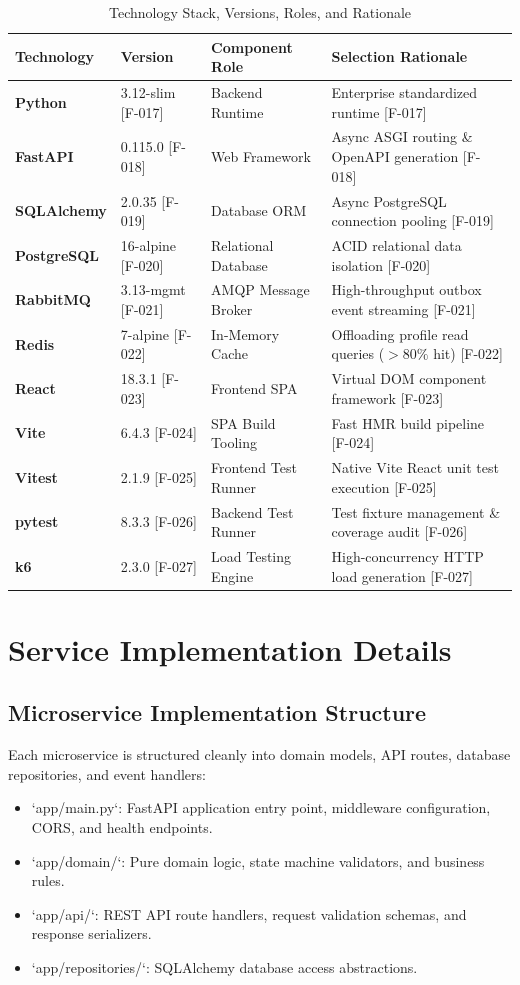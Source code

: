\documentclass[11pt,a4paper]{article}
\begin{document}
\begin{table}[htbp]
\caption{Technology Stack, Versions, Roles, and Rationale}
\centering
\begin{tabularx}{\linewidth}{l l X X}
\toprule
\textbf{Technology} & \textbf{Version} & \textbf{Component Role} & \textbf{Selection Rationale} \\
\midrule
\textbf{Python} & 3.12-slim [F-017] & Backend Runtime & Enterprise standardized runtime [F-017] \\
\textbf{FastAPI} & 0.115.0 [F-018] & Web Framework & Async ASGI routing \& OpenAPI generation [F-018] \\
\textbf{SQLAlchemy} & 2.0.35 [F-019] & Database ORM & Async PostgreSQL connection pooling [F-019] \\
\textbf{PostgreSQL} & 16-alpine [F-020] & Relational Database & ACID relational data isolation [F-020] \\
\textbf{RabbitMQ} & 3.13-mgmt [F-021] & AMQP Message Broker & High-throughput outbox event streaming [F-021] \\
\textbf{Redis} & 7-alpine [F-022] & In-Memory Cache & Offloading profile read queries ($>80\%$ hit) [F-022] \\
\textbf{React} & 18.3.1 [F-023] & Frontend SPA & Virtual DOM component framework [F-023] \\
\textbf{Vite} & 6.4.3 [F-024] & SPA Build Tooling & Fast HMR build pipeline [F-024] \\
\textbf{Vitest} & 2.1.9 [F-025] & Frontend Test Runner & Native Vite React unit test execution [F-025] \\
\textbf{pytest} & 8.3.3 [F-026] & Backend Test Runner & Test fixture management \& coverage audit [F-026] \\
\textbf{k6} & 2.3.0 [F-027] & Load Testing Engine & High-concurrency HTTP load generation [F-027] \\
\bottomrule
\end{tabularx}
\end{table}

\section{Service Implementation Details}

\subsection{Microservice Implementation Structure}
Each microservice is structured cleanly into domain models, API routes, database repositories, and event handlers:
\begin{itemize}
    \item `app/main.py`: FastAPI application entry point, middleware configuration, CORS, and health endpoints.
    \item `app/domain/`: Pure domain logic, state machine validators, and business rules.
    \item `app/api/`: REST API route handlers, request validation schemas, and response serializers.
    \item `app/repositories/`: SQLAlchemy database access abstractions.
\end{itemize}
\end{document}
